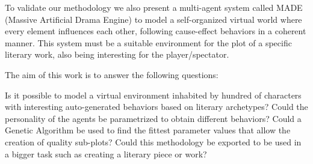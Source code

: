 \documentclass[letterpaper]{article}
\begin{document}










To validate our methodology we also present a multi-agent system called
MADE (Massive Artificial Drama Engine) to model a self-organized
virtual world where every element influences each other, following
cause-effect behaviors in a coherent manner. This system must be
a suitable environment for the plot of a specific literary work, also being
interesting for the player/spectator. %

The aim of this work is to answer the following questions:


 Is it possible to model a virtual environment inhabited by hundred of characters with interesting auto-generated behaviors based on literary archetypes?
 Could the personality of the agents be parametrized to obtain different behaviors?
 Could a Genetic Algorithm be used to find the fittest parameter values that allow the creation of quality sub-plots?
Could this methodology be exported to be used in a bigger task such as creating a literary piece or work?
\
\end{document}

